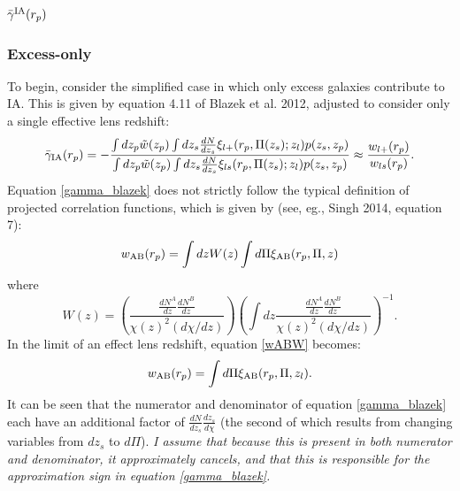 \documentclass[onecolumn,amsmath,aps,fleqn, superscriptaddress]{revtex4}
\begin{document}
\subsection{$\bar{\gamma}^{\rm IA}(r_p)$}
\subsubsection*{Excess-only}
To begin, consider the simplified case in which only excess galaxies contribute to IA. This is given by equation 4.11 of Blazek et al. 2012, adjusted to consider only a single effective lens redshift:
\begin{equation}
\bar{\gamma}_{\rm IA}(r_p) = -\frac{\int dz_p \tilde{w}(z_p) \int dz_s \frac{dN}{dz_s} \xi_{l+}(r_p, \Pi(z_s); z_l) p(z_s, z_p)}{\int dz_p \tilde{w}(z_p) \int dz_s \frac{dN}{dz_s} \xi_{ls}(r_p, \Pi(z_s); z_l) p(z_s, z_p)} \approx \frac{w_{l+}(r_p)}{w_{ls}(r_p)}.
\label{gamma_blazek}
\end{equation} 
Equation \ref{gamma_blazek} does not strictly follow the typical definition of projected correlation functions, which is given by (see, eg., Singh 2014, equation 7):
\begin{equation}
w_{\rm AB}(r_p) = \int dz W(z) \int d\Pi \xi_{\rm AB}(r_p, \Pi, z)
\label{wABW}
\end{equation}
where 
\begin{equation}
W(z) = \left(\frac{\frac{dN^A}{dz}\frac{dN^B}{dz}}{\chi(z)^2 (d\chi/dz)}\right) \left(\int dz \frac{\frac{dN^A}{dz}\frac{dN^B}{dz}}{\chi(z)^2 (d\chi/dz)}\right)^{-1}.
\label{wz}
\end{equation}
In the limit of an effect lens redshift, equation \ref{wABW} becomes:
\begin{equation}
w_{\rm AB}(r_p) = \int d\Pi \xi_{\rm AB}(r_p, \Pi, z_l).
\label{wAB}
\end{equation}
It can be seen that the numerator and denominator of equation \ref{gamma_blazek} each have an additional factor of $\frac{dN}{dz_s}\frac{dz_s}{d\chi}$ (the second of which results from changing variables from $dz_s$ to $d\Pi$). {\it I assume that because this is present in both numerator and denominator, it approximately cancels, and that this is responsible for the approximation sign in equation \ref{gamma_blazek}.} 
\end{document}
